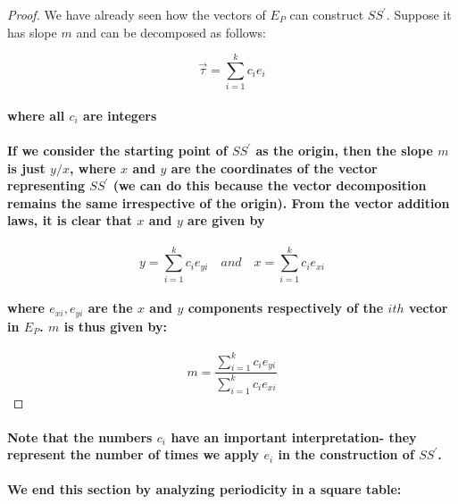 \documentclass{report}
\begin{document}
\begin{proof}
{We have already seen how the vectors of $E_P$ can construct $SS^\prime$. Suppose it has slope $m$ and can be decomposed as follows:

\begin{equation}
\vec{\tau}=\sum_{i=1}^k c_ie_i 
\end{equation}

\paragraph{where all $c_i$ are integers}

\paragraph{If we consider the starting point of $SS^\prime$ as the origin, then the slope $m$ is just $y/x$, where $x$ and $y$ are the coordinates of the vector representing $SS^\prime$ (we can do this because the vector decomposition remains the same irrespective of the origin). From the vector addition laws, it is clear that $x$ and $y$ are given by}

\begin{equation}
y=\sum_{i=1}^k c_ie_{yi}\quad and
\quad x=\sum_{i=1}^k c_ie_{xi}
\end{equation}

\paragraph{where $e_{xi}, e_{yi}$ are the $x$ and $y$ components respectively of the $ith$ vector in $E_P$. $m$ is thus given by:}

\begin{equation}
m=\frac{\sum_{i=1}^k  c_ie_{yi} }{\sum_{i=1}^k  c_ie_{xi} }
\end{equation}
}
\end{proof}

\paragraph{Note that the numbers $c_i$ have an important interpretation- they represent the number of times we apply $e_i$ in the construction of $SS^\prime$.}



\paragraph{We end this section by analyzing periodicity in a square table:}
\end{document}

